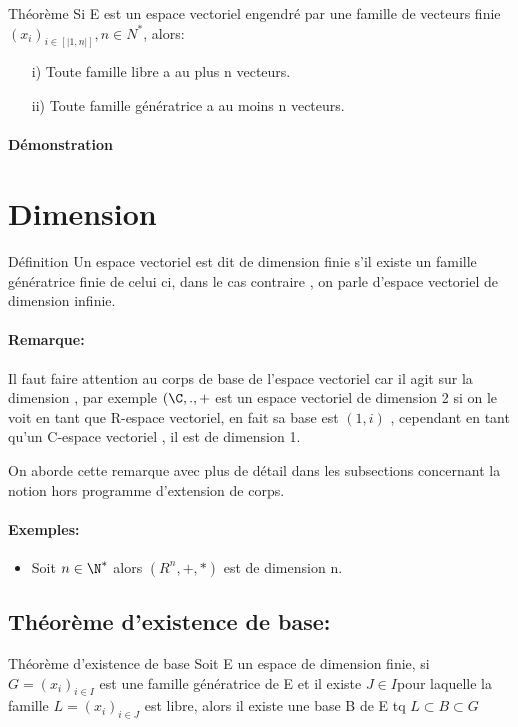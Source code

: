 \documentclass{book}
\begin{document}
\begin{Théorème}[]{Théorème}{}
Si E est un espace vectoriel engendré par une famille de vecteurs finie ${\displaystyle (x_{i})_{i\in [|1,n|]}, n \in N^*}$, alors:
\begin{itemize}
    \item[i)] Toute famille libre a au plus n vecteurs.
    \item[ii)] Toute famille génératrice a au moins n vecteurs.
\end{itemize}

\end{Théorème}
\paragraph{Démonstration}
\section{Dimension}
\begin{Définition}[]{Définition}{}
Un espace vectoriel est dit de dimension finie s'il existe un famille génératrice finie de celui ci, dans le cas contraire , on parle d'espace vectoriel de dimension infinie.
\end{Définition}
\paragraph{Remarque: }
Il faut faire attention au corps de base de l'espace vectoriel car il agit sur la dimension , par exemple \((\C,.,+\) est un espace vectoriel de dimension 2 si on le voit en tant que R-espace vectoriel, en fait sa base est \((1,i)\) , cependant en tant qu'un C-espace vectoriel , il est de dimension 1.

On aborde cette remarque avec plus de détail dans les subsections concernant la notion hors programme d'extension de corps.
\paragraph{Exemples: }
\begin{itemize}
    \item Soit \(n \in \N^*\) alors \((R^n,+,*)\) est de dimension n.
    
\end{itemize}
\subsection{Théorème d'existence de base:}
\begin{Théorème}[]{Théorème d'existence de base}{}
Soit E un espace de dimension finie, si ${\displaystyle G=(x_{i})_{i\in I}}$ est une famille génératrice de E et il existe ${\displaystyle{J \in I}}$pour laquelle la famille  ${\displaystyle L=(x_{i})_{i\in J}}$ est libre, alors il existe une base B de E tq ${\displaystyle {L\subset B\subset G}}$ 
\end{Théorème}
\end{document}
